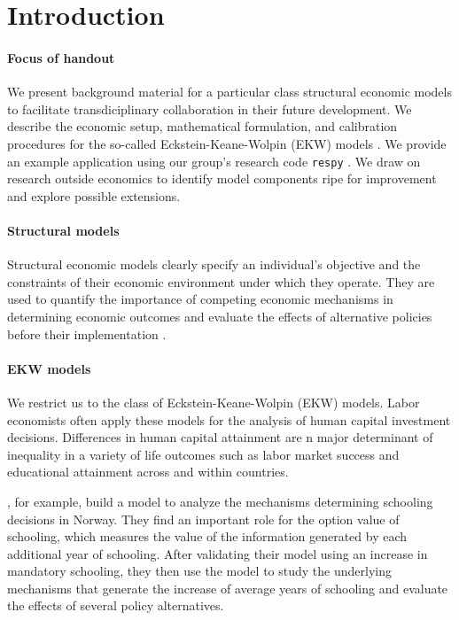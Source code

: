\section{Introduction}
\paragraph{Focus of handout} We present background material for a particular class structural economic models to facilitate transdiciplinary collaboration in their future development. We describe the economic setup, mathematical formulation, and calibration procedures for the so-called Eckstein-Keane-Wolpin (EKW) models \citep{Aguirregabiria.2010}. We provide an example application using our group's research code \verb+respy+ \citep{respy-1.0}. We draw on research outside economics to identify model components ripe for improvement and explore possible extensions.

\paragraph{Structural models}  Structural economic models clearly specify an individual's objective and the constraints of their economic environment under which they operate. They are used to quantify the importance of competing economic mechanisms in determining economic outcomes and evaluate the effects of alternative policies before their implementation \citep{Wolpin.2013}.

\paragraph{EKW models} We restrict us to the class of Eckstein-Keane-Wolpin (EKW) models. Labor economists often apply these models for the analysis of human capital investment decisions. Differences in human capital attainment are n major determinant of inequality in a variety of life outcomes such as labor market success and educational attainment across
and within countries.

\citet{Bhuller.2018}, for example, build a model to analyze the mechanisms determining schooling decisions in Norway. They find an important role for the option value of schooling, which measures the value of the information generated by each additional year of schooling.
After validating their model using an increase in mandatory schooling, they then use the model to study the underlying mechanisms that generate the increase of average years of schooling and evaluate the effects of several policy alternatives.

